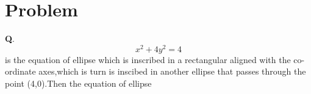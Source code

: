  \lstset{
frame=single, 
breaklines=true,
columns=fullflexible
}

\title{\mytitle}
\author{\myauthor\hspace{1em}\\\contact\\IITH\hspace{0.5em}-\hspace{0.5em}\mymodule}
\date{}
\hypersetup{pdfauthor=\myauthor,pdftitle=\mytitle,pdfkeywords=\mykeywords}
\sloppy

 \maketitle
 \tableofcontents
  \Large\section{Problem}
 \textbf{Q}.
 \begin{equation}
	x^2+4y^2=4
	\end{equation}is the equation of ellipse which is inscribed in a rectangular aligned with the co-ordinate axes,which is turn is inscibed in another ellipse that passes through the point (4,0).Then the equation of ellipse
